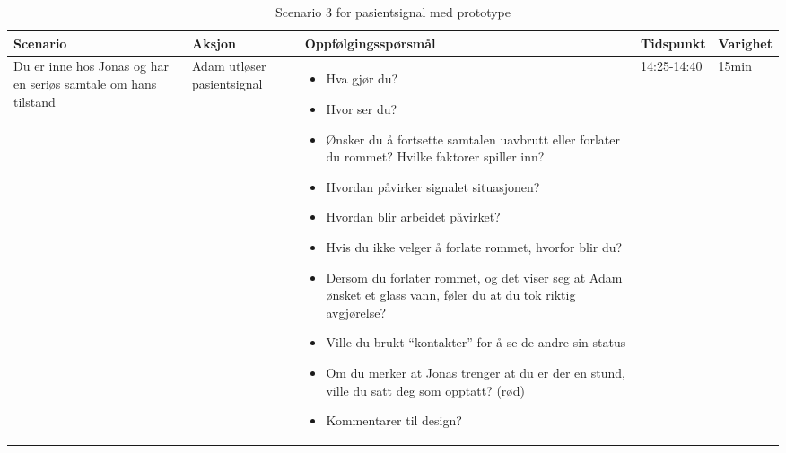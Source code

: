 \begin{table}[H]
\small
\begin{tabular}{p{3cm}|p{2cm}|p{4cm}|l|l}
\hline
\textbf{Scenario} & \textbf{Aksjon} & \textbf{Oppfølgingsspørsmål} & \textbf{Tidspunkt} & \textbf{Varighet}\\
\hline
Du er inne hos Jonas og har en seriøs samtale om hans tilstand & Adam utløser pasientsignal & \begin{itemize}
\item Hva gjør du?
\item Hvor ser du?
\item Ønsker du å fortsette samtalen uavbrutt eller forlater du rommet? Hvilke faktorer spiller inn?
\item Hvordan påvirker signalet situasjonen?
\item Hvordan blir arbeidet påvirket?
\item Hvis du ikke velger å forlate rommet, hvorfor blir du?
\item Dersom du forlater rommet, og det viser seg at Adam ønsket et glass vann, føler du at du tok riktig avgjørelse?
\item Ville du brukt “kontakter” for å se de andre sin status
\item Om du merker at Jonas trenger at du er der en stund, ville du satt deg som opptatt? (rød)
\item Kommentarer til design?
\end{itemize}
& 14:25-14:40 & 15min\\
\end{tabular}\\
\caption{Scenario 3 for pasientsignal med prototype}
\label{Steg3.3}
\end{table}

